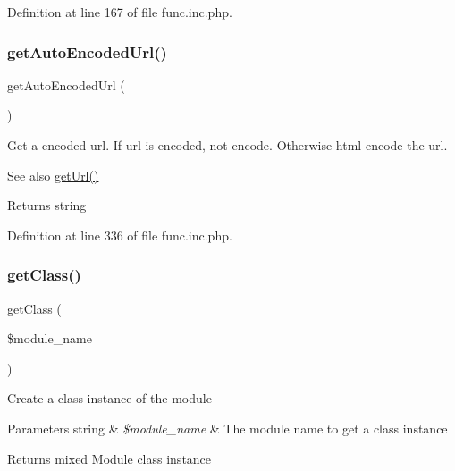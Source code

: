 Definition at line 167 of file func.\+inc.\+php.

\hypertarget{func_8inc_8php_a77e631a54eea5ecea3a77feb56129104}{}\label{func_8inc_8php_a77e631a54eea5ecea3a77feb56129104} 
\subsubsection{\texorpdfstring{get\+Auto\+Encoded\+Url()}{getAutoEncodedUrl()}}
{\footnotesize\ttfamily get\+Auto\+Encoded\+Url (\begin{DoxyParamCaption}{ }\end{DoxyParamCaption})}

Get a encoded url. If url is encoded, not encode. Otherwise html encode the url.

\begin{DoxySeeAlso}{See also}
\hyperlink{func_8inc_8php_accd14bda49a1044b4d8dd93f020f11ee}{get\+Url()} 
\end{DoxySeeAlso}
\begin{DoxyReturn}{Returns}
string 
\end{DoxyReturn}


Definition at line 336 of file func.\+inc.\+php.

\hypertarget{func_8inc_8php_a1d90f6abc9ca2d1a4500071159ebd4e7}{}\label{func_8inc_8php_a1d90f6abc9ca2d1a4500071159ebd4e7} 
\subsubsection{\texorpdfstring{get\+Class()}{getClass()}}
{\footnotesize\ttfamily get\+Class (\begin{DoxyParamCaption}\item[{}]{\$module\+\_\+name }\end{DoxyParamCaption})}

Create a class instance of the module


\begin{DoxyParams}[1]{Parameters}
string & {\em \$module\+\_\+name} & The module name to get a class instance \\
\hline
\end{DoxyParams}
\begin{DoxyReturn}{Returns}
mixed Module class instance 
\end{DoxyReturn}


